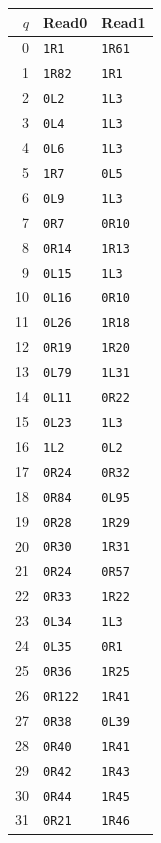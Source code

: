 \begin{center}
\scriptsize\renewcommand{\arraystretch}{0.86}
\begin{minipage}[t]{0.32\linewidth}\centering
\begin{tabular}{rll}\toprule
$q$&Read0&Read1\\\midrule
0&\texttt{1R1}&\texttt{1R61}\\
1&\texttt{1R82}&\texttt{1R1}\\
2&\texttt{0L2}&\texttt{1L3}\\
3&\texttt{0L4}&\texttt{1L3}\\
4&\texttt{0L6}&\texttt{1L3}\\
5&\texttt{1R7}&\texttt{0L5}\\
6&\texttt{0L9}&\texttt{1L3}\\
7&\texttt{0R7}&\texttt{0R10}\\
8&\texttt{0R14}&\texttt{1R13}\\
9&\texttt{0L15}&\texttt{1L3}\\
10&\texttt{0L16}&\texttt{0R10}\\
11&\texttt{0L26}&\texttt{1R18}\\
12&\texttt{0R19}&\texttt{1R20}\\
13&\texttt{0L79}&\texttt{1L31}\\
14&\texttt{0L11}&\texttt{0R22}\\
15&\texttt{0L23}&\texttt{1L3}\\
16&\texttt{1L2}&\texttt{0L2}\\
17&\texttt{0R24}&\texttt{0R32}\\
18&\texttt{0R84}&\texttt{0L95}\\
19&\texttt{0R28}&\texttt{1R29}\\
20&\texttt{0R30}&\texttt{1R31}\\
21&\texttt{0R24}&\texttt{0R57}\\
22&\texttt{0R33}&\texttt{1R22}\\
23&\texttt{0L34}&\texttt{1L3}\\
24&\texttt{0L35}&\texttt{0R1}\\
25&\texttt{0R36}&\texttt{1R25}\\
26&\texttt{0R122}&\texttt{1R41}\\
27&\texttt{0R38}&\texttt{0L39}\\
28&\texttt{0R40}&\texttt{1R41}\\
29&\texttt{0R42}&\texttt{1R43}\\
30&\texttt{0R44}&\texttt{1R45}\\
31&\texttt{0R21}&\texttt{1R46}\\

\end{tabular}
\end{minipage}
\end{center}
